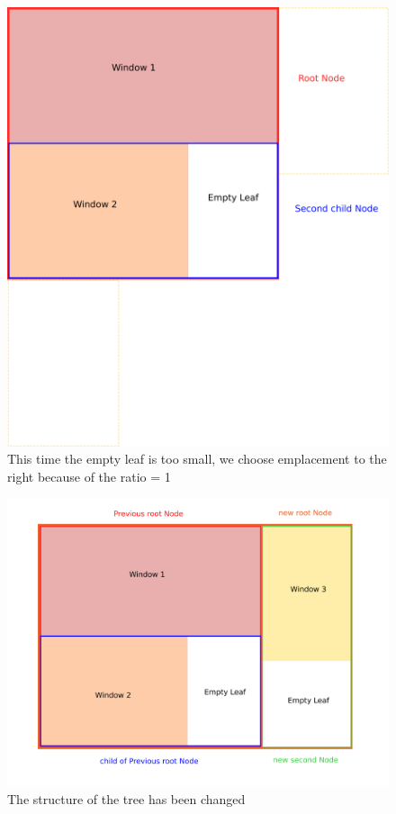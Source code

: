 \documentclass{acmtog}
\begin{document}
\begin{figure}
  \includegraphics[width=\linewidth]{Images/Insertion.png}
  \caption{This time the empty leaf is too small, we choose emplacement to the right because of the ratio = 1}
  \label{fig:Insertion}
\end{figure}

\begin{figure}
  \includegraphics[width=\linewidth]{Images/InsertionFin.png}
  \caption{The structure of the tree has been changed}
  \label{fig:InsertionFin}
\end{figure}
\end{document}
